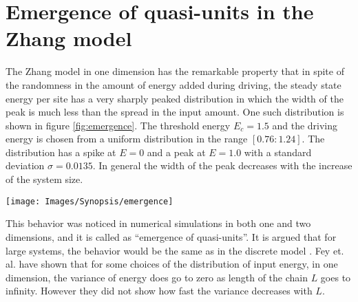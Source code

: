 \documentclass[11pt,a4paper]{book}
\begin{document}
\section[Zhang model]{Emergence of quasi-units in the Zhang model}\label{sec:zhang}
The Zhang model in one dimension has the remarkable property that in spite of
the randomness in the amount of energy added during driving, the
steady state energy per site has a very sharply peaked
distribution in which the width of the peak is much less than the
spread in the input amount. One such distribution is shown
in figure \ref{fig:emergence}. The threshold energy $E_{c}=1.5$ and
the driving energy is chosen from a uniform distribution in the range
$\left[ 0.76:1.24 \right]$. The distribution has a spike at $E=0$ and
a peak at $E=1.0$ with a standard deviation $\sigma=0.0135$. In general
the width of the peak decreases with the increase of
the system size.
\begin{SCfigure}
\texttt{[image: Images/Synopsis/emergence]}
\label{fig:emergence}
\caption{The probability distribution of energy per site in the Zhang model defined on
a linear chain of length $L=100$.}
\end{SCfigure}

This behavior was noticed in numerical simulations in
both one and two dimensions, and it is called as ``emergence of
quasi-units''. It is argued that for large systems, the behavior would
be the same as in the discrete model \cite{zhang}. Fey et. al.
\cite{fey} have
shown that for some choices of the distribution of input energy, in
one dimension, the variance of energy does go to zero as length of the
chain $L$ goes to infinity. However they did not show how fast the
variance decreases with $L$.
\end{document}
